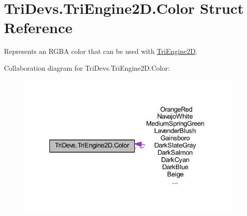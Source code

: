 \hypertarget{struct_tri_devs_1_1_tri_engine2_d_1_1_color}{\section{Tri\-Devs.\-Tri\-Engine2\-D.\-Color Struct Reference}
\label{struct_tri_devs_1_1_tri_engine2_d_1_1_color}
}


Represents an R\-G\-B\-A color that can be used with \hyperlink{namespace_tri_devs_1_1_tri_engine2_d}{Tri\-Engine2\-D}.  




Collaboration diagram for Tri\-Devs.\-Tri\-Engine2\-D.\-Color\-:
\nopagebreak
\begin{figure}[H]
\begin{center}
\leavevmode
\includegraphics[width=315pt]{struct_tri_devs_1_1_tri_engine2_d_1_1_color__coll__graph}
\end{center}
\end{figure}

